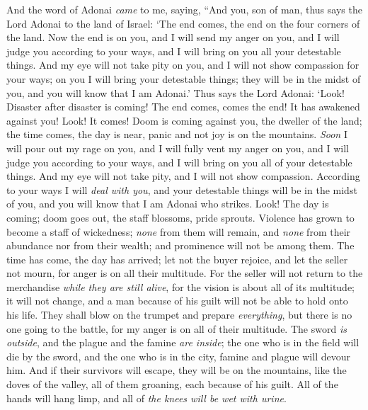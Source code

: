 \begin{biblechapter} %
 And the word of Adonai \textit{came} to me, saying,
\verse “And you, son of man, thus says the Lord Adonai to the land of Israel: ‘The end comes, the end on the four corners of the land.
\verse Now the end is on you, and I will send my anger on you, and I will judge you according to your ways, and I will bring on you all your detestable things.
\verse And my eye will not take pity on you, and I will not show compassion for your ways; on you I will bring your detestable things; they will be in the midst of you, and you will know that I am Adonai.’
\verse Thus says the Lord Adonai: ‘Look! Disaster after disaster is coming!
\verse The end comes, comes the end! It has awakened against you! Look! It comes!
\verse Doom is coming against you, the dweller of the land; the time comes, the day is near, panic and not joy is on the mountains.
\verse \textit{Soon} I will pour out my rage on you, and I will fully vent my anger on you, and I will judge you according to your ways, and I will bring on you all of your detestable things.
\verse And my eye will not take pity, and I will not show compassion. According to your ways I will \textit{deal with you}, and your detestable things will be in the midst of you, and you will know that I am Adonai who strikes.
\verse Look! The day is coming; doom goes out, the staff blossoms, pride sprouts.
\verse Violence has grown to become a staff of wickedness; \textit{none} from them will remain, and \textit{none} from their abundance nor from their wealth; and prominence will not be among them.
\verse The time has come, the day has arrived; let not the buyer rejoice, and let the seller not mourn, for anger is on all their multitude.
\verse For the seller will not return to the merchandise \textit{while they are still alive}, for the vision is about all of its multitude; it will not change, and a man because of his guilt will not be able to hold onto his life.
\verse They shall blow on the trumpet and prepare \textit{everything}, but there is no one going to the battle, for my anger is on all of their multitude.
\verse The sword \textit{is outside}, and the plague and the famine \textit{are inside}; the one who is in the field will die by the sword, and the one who is in the city, famine and plague will devour him.
\verse And if their survivors will escape, they will be on the mountains, like the doves of the valley, all of them groaning, each because of his guilt.
\verse All of the hands will hang limp, and all of \textit{the knees will be wet with urine}.

\end{biblechapter}
